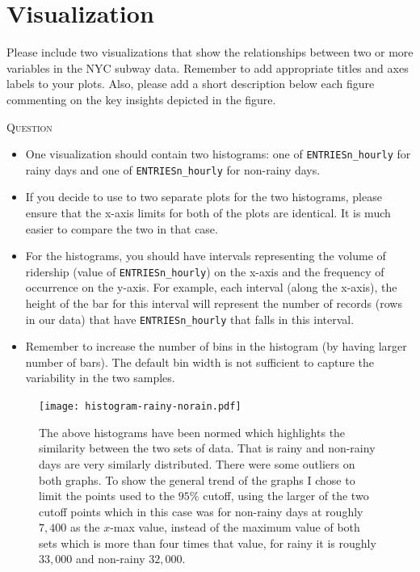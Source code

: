 \documentclass{article}
\newcounter{questionCtr}
\newenvironment{question}{%
   \bigskip\noindent%
   \refstepcounter{questionCtr}%
   \textsc{Question \thequestionCtr}%
   \newline%
   }{\par\bigskip}  %
\numberwithin{questionCtr}{section}
\numberwithin{problemCtr}{section}
\begin{document}
\section{Visualization}
Please include two visualizations that show the relationships between two or
more variables in the NYC subway data.
Remember to add appropriate titles and axes labels to your plots. Also, please
add a short description below each figure commenting on the key insights
depicted in the figure.

\begin{question}
\begin{itemize}
  \item One visualization should contain two histograms: one of
    \verb|ENTRIESn_hourly| for rainy days and one of \verb|ENTRIESn_hourly| for
    non-rainy days.
  \item If you decide to use to two separate plots for the two histograms,
    please ensure that the x-axis limits for both of the plots are identical. It
    is much easier to compare the two in that case.
  \item For the histograms, you should have intervals representing the volume of
    ridership (value of \verb|ENTRIESn_hourly|) on the x-axis and the frequency of
    occurrence on the y-axis. For example, each interval (along the x-axis), the
    height of the bar for this interval will represent the number of records
    (rows in our data) that have \verb|ENTRIESn_hourly| that falls in this interval.
  \item Remember to increase the number of bins in the histogram (by having
    larger number of bars). The default bin width is not sufficient to capture
    the variability in the two samples.
\end{itemize}
\end{question}

\begin{figure}[ht]
  \centering
  \texttt{[image: histogram-rainy-norain.pdf]}
  \caption{The above histograms have been normed which highlights the similarity
    between the two sets of data.  That is rainy and non-rainy days are very
    similarly distributed.  There were some outliers on both graphs.  To show
    the general trend of the graphs I chose to limit the points used to the
    $95\%$ cutoff, using the larger of the two cutoff points which in this case
    was for non-rainy days at roughly $7,400$ as the $x$-max value, instead of
    the maximum value of both sets which is more than four times that value, for
  rainy it is roughly $33,000$ and non-rainy $32,000$.}
\label{fig:histo-entries_hourly}
\end{figure}
\end{document}
